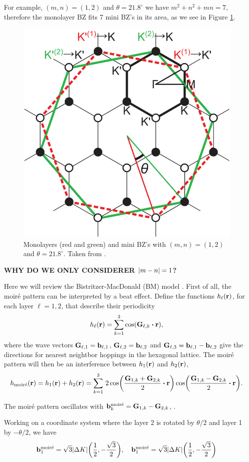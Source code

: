 \documentclass[12pt]{report}
\begin{document}
For example, $(m,n) = (1,2)$ and $\theta = 21.8^\circ$ we have $m^2 + n^2 + mn = 7$, therefore the monolayer BZ fits 7 mini BZ's in its area, as we see in Figure \ref{fig:bzminibz}.
\begin{figure}[H]
\centering
\includegraphics[width=0.5\linewidth]{fig/tbg/bzminibz.png}
\caption{Monolayers (red and green) and mini BZ's with $(m,n) = (1,2)$ and $\theta = 21.8^\circ$. Taken from \cite{koshino2012}.}
\label{fig:bzminibz}
\end{figure}

\textbf{WHY DO WE ONLY CONSIDERER $\abs{m-n} = 1$?}


Here we will review the Bistritzer-MacDonald (BM) model \cite{macdonald2011}. First of all, the moiré pattern can be interpreted by a beat effect. Define the functions $h_\ell({\vb{r}})$, for each layer $\ell = 1, 2$, that describe their periodicity
$$
h_\ell(\r) = \sum_{k=1}^{3} \cos(\vb{G}_{\ell,k} \vdot \r),
$$
where the wave vectors $\vb{G}_{\ell,1} = \vb{b}_{\ell,1}$, $\vb{G}_{\ell,2} = \vb{b}_{\ell,2}$ and $\vb{G}_{\ell,3} = \vb{b}_{\ell,1} - \vb{b}_{\ell,2}$ give the directions for nearest neightbor hoppings in the hexagonal lattice. The moiré pattern will then be an interference between $h_1({\vb{r}})$ and $h_2({\vb{r}})$,
$$
h_{\text{moiré}}(\r) = h_1(\r) + h_2(\r) =
\sum_{k=1}^{3}
\, 2 \cos(\frac{\vb{G}_{1,k}+\vb{G}_{2,k}}{2} \vdot \r) \cos(\frac{\vb{G}_{1,k}-\vb{G}_{2,k}}{2} \vdot \r).
$$

The moiré pattern oscillates with $\vb{b}_k^{\text{moiré}} = \vb{G}_{1,k} - \vb{G}_{2,k}$, \cite{handbook2019}.

Working on a coordinate system where the layer 2 is rotated by $\theta/2$ and layer 1 by $-\theta/2$, we have
$$
\vb{b}_1^{\text{moiré}} = \sqrt{3} \abs{\Delta K} \qty(\frac{1}{2}, -\frac{\sqrt{3}}{2}), \quad
\vb{b}_1^{\text{moiré}} = \sqrt{3} \abs{\Delta K} \qty(\frac{1}{2}, -\frac{\sqrt{3}}{2})
$$
\end{document}
